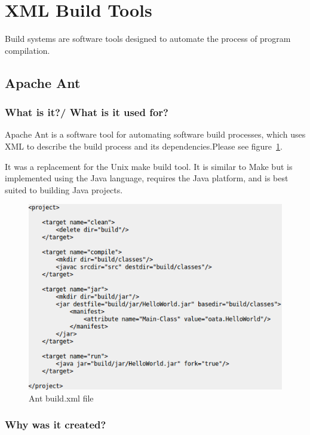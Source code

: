 \section{XML Build Tools}
Build systems are software tools designed to automate the process of program compilation.

\subsection{Apache Ant}
\subsubsection{What is it?/ What is it used for?}

Apache Ant is a software tool for automating software build processes, which uses XML to describe the build process and its dependencies.Please see figure~\ref{fig:buildxml}.

It was a replacement for the Unix make build tool. It is similar to Make but is implemented using the Java language, requires the Java platform, and is best suited to building Java projects.




\begin{figure}[hb]
    \center{}
    \includegraphics[width=1\textwidth]{buildxml}
    \caption{Ant build.xml file
    \protect\footnotemark}\label{fig:buildxml}
\end{figure}

\subsubsection{Why was it created?}



